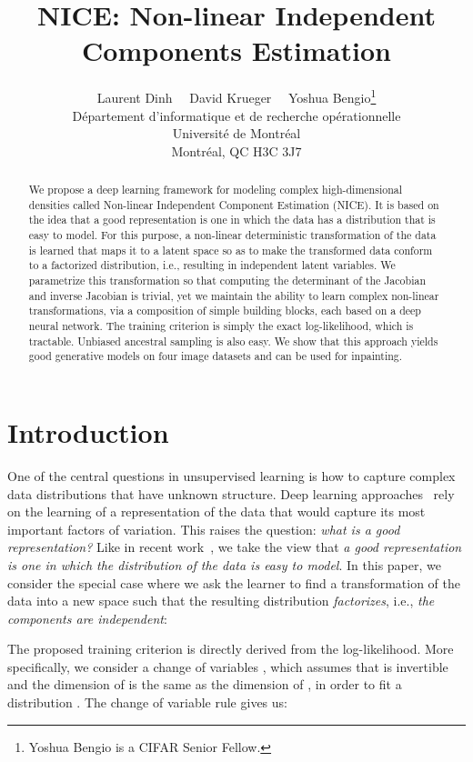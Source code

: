 \documentclass{article}
\title{NICE: Non-linear Independent Components Estimation}
\author{Laurent Dinh
\ \  David Krueger
\ \ Yoshua Bengio\thanks{Yoshua Bengio is a CIFAR Senior Fellow.}\\
D\'epartement d'informatique et de recherche op\'erationnelle\\
Universit\'e de Montr\'eal\\
Montr\'eal, QC H3C 3J7 \\
}
\date{}
\begin{document}
\maketitle

\begin{abstract}
We propose a deep learning framework for modeling complex high-dimensional
densities called Non-linear Independent Component Estimation (NICE).  It is based
on the idea that a good representation is one in which the data has a distribution
that is easy to model. For this purpose, a
non-linear deterministic transformation of the data is learned that maps it to a latent space
so as to make the transformed data conform to a factorized distribution,
i.e., resulting in independent latent variables. 
We parametrize this transformation so that computing the determinant of the Jacobian and inverse Jacobian is trivial, yet we maintain the
ability to learn complex non-linear transformations, via a composition of
simple building blocks, each based on a deep neural network. The training
criterion is simply the exact log-likelihood, which is tractable. Unbiased ancestral
sampling is also easy. We show that this approach yields good
generative models on four image datasets and can be used for inpainting.
\end{abstract}

\section{Introduction}

One of the central questions in unsupervised learning is how to capture
complex data distributions that have unknown structure. Deep learning
approaches~\citep{Bengio-2009-book} rely on the learning of a representation
of the data that would capture its most important factors
of variation. This raises the question: {\em what is a good representation?}
Like in recent work~\citep{Kingma+Welling-ICLR2014,Rezende-et-al-arxiv2014,Ozair+Bengio-arxiv2014},
we take the view that {\em a good representation is one in which the distribution
of the data is easy to model}.  In this paper,  we consider the
special case where we ask the learner to find a transformation  of the data
into a new space such that the resulting distribution {\em factorizes}, i.e., 
{\em the components  are independent}:



The proposed training criterion is directly derived from the log-likelihood.
More specifically, we consider a change of variables ,
which assumes that  is invertible and the dimension of  is the same
as the dimension of , in order to fit a distribution .
The change of variable rule gives us: 
\end{document}
